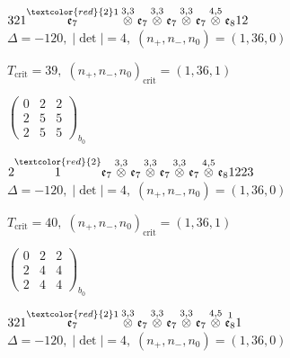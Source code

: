 \documentclass[10pt]{article}
\begin{document}
\smallskip

$321\overset{\textcolor{red}{2}1}{\mathfrak{e}_7}\overset{3,3}{\otimes}\mathfrak{e}_7\overset{3,3}{\otimes}\mathfrak{e}_7\overset{3,3}{\otimes}\mathfrak{e}_7\overset{4,5}{\otimes}\mathfrak{e}_812$ \quad $\Delta=-120,\; |\det|=4,\; (n_+,n_-,n_0)=(1,36,0)$

\hspace{1em}$T_{\text{crit}}=39,\; (n_+,n_-,n_0)_{\text{crit}}=(1,36,1)$

\hspace{2em}$\left(\begin{smallmatrix}0 & 2 & 2 \\ 2 & 5 & 5 \\ 2 & 5 & 5\end{smallmatrix}\right)_{\!b_0}$

\smallskip

$2\overset{\textcolor{red}{2}}{1}\mathfrak{e}_7\overset{3,3}{\otimes}\mathfrak{e}_7\overset{3,3}{\otimes}\mathfrak{e}_7\overset{3,3}{\otimes}\mathfrak{e}_7\overset{4,5}{\otimes}\mathfrak{e}_81223$ \quad $\Delta=-120,\; |\det|=4,\; (n_+,n_-,n_0)=(1,36,0)$

\hspace{1em}$T_{\text{crit}}=40,\; (n_+,n_-,n_0)_{\text{crit}}=(1,36,1)$

\hspace{2em}$\left(\begin{smallmatrix}0 & 2 & 2 \\ 2 & 4 & 4 \\ 2 & 4 & 4\end{smallmatrix}\right)_{\!b_0}$

\smallskip

$321\overset{\textcolor{red}{2}1}{\mathfrak{e}_7}\overset{3,3}{\otimes}\mathfrak{e}_7\overset{3,3}{\otimes}\mathfrak{e}_7\overset{3,3}{\otimes}\mathfrak{e}_7\overset{4,5}{\otimes}\overset{1}{\mathfrak{e}_8}1$ \quad $\Delta=-120,\; |\det|=4,\; (n_+,n_-,n_0)=(1,36,0)$
\end{document}
